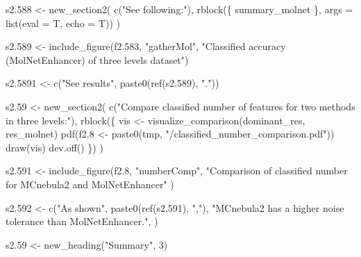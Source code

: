 \documentclass[
]{article}
\newenvironment{Shaded}{\begin{snugshade}}{\end{snugshade}}
\newcommand{\AttributeTok}[1]{\textcolor[rgb]{0.77,0.63,0.00}{#1}}
\newcommand{\DecValTok}[1]{\textcolor[rgb]{0.00,0.00,0.81}{#1}}
\newcommand{\FloatTok}[1]{\textcolor[rgb]{0.00,0.00,0.81}{#1}}
\newcommand{\FunctionTok}[1]{\textcolor[rgb]{0.00,0.00,0.00}{#1}}
\newcommand{\NormalTok}[1]{#1}
\newcommand{\OtherTok}[1]{\textcolor[rgb]{0.56,0.35,0.01}{#1}}
\newcommand{\StringTok}[1]{\textcolor[rgb]{0.31,0.60,0.02}{#1}}
\begin{document}
\begin{Shaded}
\begin{Highlighting}[]
\NormalTok{s2}\FloatTok{.588} \OtherTok{\textless{}{-}} \FunctionTok{new\_section2}\NormalTok{(}
  \FunctionTok{c}\NormalTok{(}\StringTok{"See following:"}\NormalTok{),}
  \FunctionTok{rblock}\NormalTok{(\{}
\NormalTok{    summary\_molnet}
\NormalTok{  \}, }\AttributeTok{args =} \FunctionTok{list}\NormalTok{(}\AttributeTok{eval =}\NormalTok{ T, }\AttributeTok{echo =}\NormalTok{ T))}
\NormalTok{)}

\NormalTok{s2}\FloatTok{.589} \OtherTok{\textless{}{-}} \FunctionTok{include\_figure}\NormalTok{(f2}\FloatTok{.583}\NormalTok{, }\StringTok{"gatherMol"}\NormalTok{,}
  \StringTok{"Classified accuracy (MolNetEnhancer) of three levels dataset"}\NormalTok{)}

\NormalTok{s2}\FloatTok{.5891} \OtherTok{\textless{}{-}} \FunctionTok{c}\NormalTok{(}\StringTok{"See results"}\NormalTok{, }\FunctionTok{paste0}\NormalTok{(}\FunctionTok{ref}\NormalTok{(s2}\FloatTok{.589}\NormalTok{), }\StringTok{"."}\NormalTok{))}

\NormalTok{s2}\FloatTok{.59} \OtherTok{\textless{}{-}} \FunctionTok{new\_section2}\NormalTok{(}
  \FunctionTok{c}\NormalTok{(}\StringTok{"Compare classified number of features for two methods in three levels:"}\NormalTok{),}
  \FunctionTok{rblock}\NormalTok{(\{}
\NormalTok{    vis }\OtherTok{\textless{}{-}} \FunctionTok{visualize\_comparison}\NormalTok{(dominant\_res, res\_molnet)}
    \FunctionTok{pdf}\NormalTok{(f2}\FloatTok{.8} \OtherTok{\textless{}{-}} \FunctionTok{paste0}\NormalTok{(tmp, }\StringTok{"/classified\_number\_comparison.pdf"}\NormalTok{))}
    \FunctionTok{draw}\NormalTok{(vis)}
    \FunctionTok{dev.off}\NormalTok{()}
\NormalTok{  \})}
\NormalTok{)}

\NormalTok{s2}\FloatTok{.591} \OtherTok{\textless{}{-}} \FunctionTok{include\_figure}\NormalTok{(f2}\FloatTok{.8}\NormalTok{, }\StringTok{"numberComp"}\NormalTok{,}
  \StringTok{"Comparison of classified number for MCnebula2 and MolNetEnhancer"}
\NormalTok{)}

\NormalTok{s2}\FloatTok{.592} \OtherTok{\textless{}{-}} \FunctionTok{c}\NormalTok{(}\StringTok{"As shown"}\NormalTok{, }\FunctionTok{paste0}\NormalTok{(}\FunctionTok{ref}\NormalTok{(s2}\FloatTok{.591}\NormalTok{), }\StringTok{","}\NormalTok{),}
  \StringTok{"MCnebula2 has a higher noise tolerance than MolNetEnhancer."}\NormalTok{,}
\NormalTok{)}

\NormalTok{s2}\FloatTok{.59} \OtherTok{\textless{}{-}} \FunctionTok{new\_heading}\NormalTok{(}\StringTok{"Summary"}\NormalTok{, }\DecValTok{3}\NormalTok{)}


\end{Highlighting}
\end{Shaded}
\end{document}
